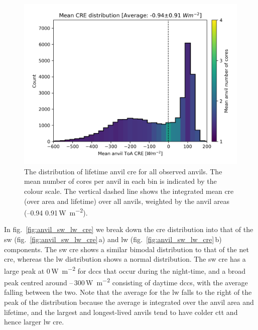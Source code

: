 \begin{figure}[tp]
    \includegraphics[width=\textwidth]{figures/chapter4_14.png}
    \caption[
    The distribution of lifetime anvil \acrshort{cre} for all observed anvils
    ]{
    The distribution of lifetime anvil \acrshort{cre} for all observed anvils. The mean number of cores per anvil in each bin is indicated by the colour scale. The vertical dashed line shows the integrated mean \acrshort{cre} (over area and lifetime) over all anvils, weighted by the anvil areas (--0.94\,\textpm\,0.91\,\unit{W m^{-2}}).
    }
    \label{fig:anvil_cre_dist}
\end{figure}


In fig.~\ref{fig:anvil_sw_lw_cre} we break down the \acrshort{cre} distribution into that of the \acrshort{sw} (fig.~\ref{fig:anvil_sw_lw_cre}\,a) and \acrshort{lw} (fig.~\ref{fig:anvil_sw_lw_cre}\,b) components. 
The \acrshort{sw} \acrshort{cre} shows a similar bimodal distribution to that of the net \acrshort{cre}, whereas the \acrshort{lw} distribution shows a normal distribution. 
The \acrshort{sw} \acrshort{cre} has a large peak at 0\,\unit{W m^{-2}} for \acrshort{dcc}s that occur during the night-time, and a broad peak centred around --\,300\,\unit{W m^{-2}} consisting of daytime \acrshort{dcc}s, with the average falling between the two. 
Note that the average for the \acrshort{lw} falls to the right of the peak of the distribution because the average is integrated over the anvil area and lifetime, and the largest and longest-lived anvils tend to have colder \acrshort{ctt} and hence larger \acrshort{lw} \acrshort{cre}.


